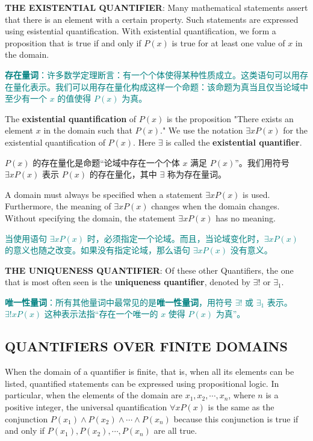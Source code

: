 \documentclass[12pt, a4paper]{article} %
\begin{document}
\textbf{THE EXISTENTIAL QUANTIFIER}: Many mathematical statements assert that there is an element with a certain property. Such statements are expressed using esistential quantification.
With existential quantification, we form a proposition that is true if and only if $P(x)$ is true for at least one value of $x$ in the domain.

\textcolor{teal}{
    \textbf{存在量词}：许多数学定理断言：有一个个体使得某种性质成立。这类语句可以用存在量化表示。我们可以用存在量化构成这样一个命题：该命题为真当且仅当论域中至少有一个 $x$ 的值使得 $P(x)$ 为真。
}

\begin{definition}
    The \textbf{existential quantification} of $P(x)$ is the proposition "There exists an element $x$ in the domain such that $P(x)$."
    We use the notation $\exists x P(x)$ for the existential quantification of $P(x)$. Here $\exists$ is called the \textbf{existential quantifier}.
\end{definition}

\begin{theorem}
    $P(x)$ 的存在量化是命题“论域中存在一个个体 $x$ 满足 $P(x)$”。我们用符号 $\exists x P(x)$ 表示 $P(x)$ 的存在量化，其中 $\exists$ 称为存在量词。
\end{theorem}

A domain must always be specified when a statement $\exists x P(x)$ is used. Furthermore, the meaning of $\exists x P(x)$ changes when the domain changes.
Without specifying the domain, the statement $\exists x P(x)$ has no meaning.

\textcolor{teal}{
    当使用语句 $\exists x P(x)$ 时，必须指定一个论域。而且，当论域变化时，$\exists x P(x)$ 的意义也随之改变。如果没有指定论域，那么语句 $\exists x P(x)$ 没有意义。
}

\textbf{THE UNIQUENESS QUANTIFIER}: Of these other Quantifiers, the one that is most often seen is the \textbf{uniqueness quantifier}, denoted by $\exists !$ or $\exists _1$.

\textcolor{teal}{
    \textbf{唯一性量词}：所有其他量词中最常见的是\textbf{唯一性量词}，用符号 $\exists !$ 或 $\exists _1$ 表示。$\exists ! x P(x)$ 这种表示法指“存在一个唯一的 $x$ 使得 $P(x)$ 为真”。
}

\subsection{QUANTIFIERS OVER FINITE DOMAINS}

When the domain of a quantifier is finite, that is, when all its elements can be listed, quantified statements can be expressed using propositional logic.
In particular, when the elements of the domain are $x_1, x_2, \cdots, x_n$, where $n$ is a positive integer, the universal quantification $\forall x P(x)$ is the same as the conjunction $P(x_1) \wedge P(x_2) \wedge \cdots \wedge P(x_n)$ because this conjunction is true if and only if $P(x_1), P(x_2), \cdots, P(x_n)$ are all true.
\end{document}
